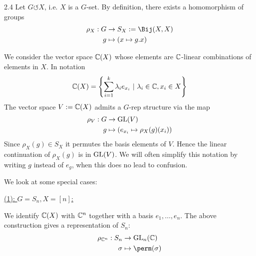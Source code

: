 \documentclass[twoside = false,	%
		headsepline,		%
		parskip = true,
		]{scrbook}						%
\begin{document}
        \begin{example}{}{2.4}
            Let $G \circlearrowleft X$, i.e. $X$ is a $G$-set. By definition, there exists a homomorphism of groups
            \begin{equation*}
            \begin{split}
                \rho_X: G &\to S_X:=\Bij(X,X) \\
                        g &\mapsto (x \mapsto g.x)
            \end{split}
            \end{equation*}
            
            We consider the vector space $\mathbb C(X)$ whose elements are $\mathbb C$-linear combinations of elements in $X$. In notation
            \begin{equation*}
                \mathbb C(X) = \left\{\sum_{i=1}^{k} \lambda_i e_{x_i} \ | \ \lambda_i \in \mathbb C, x_i \in X \right\}
            \end{equation*}
            The vector space $V:= \mathbb C(X)$ admits a $G$-rep structure via the map
            \begin{equation*}
            \begin{split}
                \rho_V: G &\to \mathrm{GL}(V) \\
                    g &\mapsto \left(e_{x_i} \mapsto \rho_X(g)(x_i)\right)
            \end{split}
            \end{equation*}
            Since $\rho_X(g) \in S_X$ it permutes the basis elements of $V$. Hence the linear continuation of $\rho_X(g)$ is in $\mathrm{GL}(V)$.
            We will often simplify this notation by writing $g$ instead of $e_g$, when this does no lead to confusion.
        \end{example}
        
        We look at some special cases:
        
        \underline{(1): $G = S_n, X = [n]$:}
        
            We identify $\mathbb C(X)$ with $\mathbb C^n$ together with a basis $e_1,\dots,e_n$. The above construction gives a representation of $S_n$:
            \begin{equation*}
            \begin{split}
                \rho_{\C^n}: S_n &\to \GL_n(\C) \\
                            \sigma &\mapsto \perm(\sigma)
            \end{split}
            \end{equation*}
            
\end{document}
